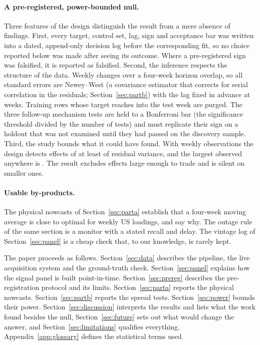 \paragraph{A pre-registered, power-bounded null.} Three features of the design
distinguish the result from a mere absence of findings. First, every target,
control set, lag, sign and acceptance bar was written into a dated, append-only
decision log before the corresponding fit, so no choice reported below was made
after seeing its outcome. Where a pre-registered sign was falsified, it is reported
as falsified. Second, the inference respects the structure of the data. Weekly
changes over a four-week horizon overlap, so all standard errors are Newey--West
(a covariance estimator that corrects for serial correlation in the residuals;
Section~\ref{sec:partb}) with the lag fixed in advance at \hacLagRule{} weeks.
Training rows whose target reaches into the test week are purged. The three
follow-up mechanism tests are held to a Bonferroni bar (the significance threshold
divided by the number of tests) and must replicate their sign on a holdout that was
not examined until they had passed on the discovery sample. Third, the study bounds
what it could have found. With \powerN{} weekly observations the design detects
effects of at least \powerFloor{} of residual variance, and the largest observed
anywhere is \bMaxRsqCov. The result excludes effects large enough to trade and is
silent on smaller ones.

\paragraph{Usable by-products.} The physical nowcasts of Section~\ref{sec:parta}
establish that a four-week moving average is close to optimal for weekly US
loadings, and say why. The outage rule of the same section is a monitor with a
stated recall and delay. The vintage log of Section~\ref{sec:panel} is a cheap
check that, to our knowledge, is rarely kept.

The paper proceeds as follows. Section~\ref{sec:data} describes the pipeline, the
live acquisition system and the ground-truth check. Section~\ref{sec:panel}
explains how the signal panel is built point-in-time. Section~\ref{sec:prereg}
describes the pre-registration protocol and its limits. Section~\ref{sec:parta}
reports the physical nowcasts. Section~\ref{sec:partb} reports the spread tests.
Section~\ref{sec:power} bounds their power. Section~\ref{sec:discussion}
interprets the results and lists what the work found besides the null,
Section~\ref{sec:future} sets out what would change the answer, and
Section~\ref{sec:limitations} qualifies everything. Appendix~\ref{app:glossary}
defines the statistical terms used.
